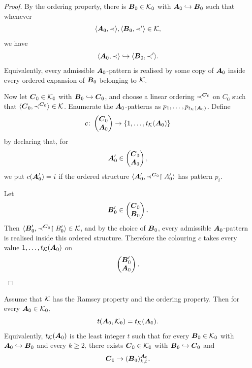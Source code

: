 \begin{proof}
    By the ordering property, there is \(\boldsymbol{B}_0\in\mathcal{K}_0\) with
    \(\boldsymbol{A}_0\hookrightarrow\boldsymbol{B}_0\) such that whenever
    \[
        \langle\boldsymbol{A}_0,\prec\rangle,\langle\boldsymbol{B}_0,\prec'\rangle\in\mathcal{K},
    \]
    we have
    \[
        \langle\boldsymbol{A}_0,\prec\rangle\hookrightarrow\langle\boldsymbol{B}_0,\prec'\rangle.
    \]
    Equivalently, every admissible \(\boldsymbol{A}_0\)-pattern is realised by some copy of \(\boldsymbol{A}_0\) inside every ordered expansion of \(\boldsymbol{B}_0\) belonging to \(\mathcal{K}\).

    Now let \(\boldsymbol{C}_0\in\mathcal{K}_0\) with \(\boldsymbol{B}_0\hookrightarrow\boldsymbol{C}_0\), and choose a linear ordering \(\prec^{\boldsymbol{C}_0}\) on \(C_0\) such that \(\langle\boldsymbol{C}_0,\prec^{\boldsymbol{C}_0}\rangle\in\mathcal{K}\). Enumerate the \(\boldsymbol{A}_0\)-patterns as \(p_1,\dots,p_{t_{\mathcal{K}}(\boldsymbol{A}_0)}\).
    Define
    \[
        c\colon\begin{pmatrix}\boldsymbol{C}_0\\ \boldsymbol{A}_0\end{pmatrix}\to\{1,\dots,t_{\mathcal{K}}(\boldsymbol{A}_0)\}
    \]
    by declaring that, for
    \[
        \boldsymbol{A}_0'\in\begin{pmatrix}\boldsymbol{C}_0\\ \boldsymbol{A}_0\end{pmatrix},
    \]
    we put \(c(\boldsymbol{A}_0')=i\) if the ordered structure \(\langle\boldsymbol{A}_0',\prec^{\boldsymbol{C}_0}\restriction A_0'\rangle\) has pattern \(p_i\).

    Let
    \[
        \boldsymbol{B}_0'\in\begin{pmatrix}\boldsymbol{C}_0\\ \boldsymbol{B}_0\end{pmatrix}.
    \]
    Then \(\langle\boldsymbol{B}_0',\prec^{\boldsymbol{C}_0}\restriction B_0'\rangle\in\mathcal{K}\), and by the choice of \(\boldsymbol{B}_0\), every admissible \(\boldsymbol{A}_0\)-pattern is realised inside this ordered structure. Therefore the colouring \(c\) takes every value \(1,\dots,t_{\mathcal{K}}(\boldsymbol{A}_0)\)
    on
    \[
        \begin{pmatrix}\boldsymbol{B}_0'\\ \boldsymbol{A}_0\end{pmatrix}.
    \]
\end{proof}

\begin{corollary}
    \label{cor:ramsey-degree-pattern-count}
    Assume that \(\mathcal{K}\) has the Ramsey property and the ordering property. Then for every \(\boldsymbol{A}_0\in\mathcal{K}_0\),
    \[
        t(\boldsymbol{A}_0,\mathcal{K}_0)=t_{\mathcal{K}}(\boldsymbol{A}_0).
    \]
    Equivalently, \(t_{\mathcal{K}}(\boldsymbol{A}_0)\) is the least integer \(t\) such that for every \(\boldsymbol{B}_0\in\mathcal{K}_0\) with \(\boldsymbol{A}_0\hookrightarrow\boldsymbol{B}_0\) and every \(k\geq 2\), there exists \(\boldsymbol{C}_0\in\mathcal{K}_0\) with \(\boldsymbol{B}_0\hookrightarrow\boldsymbol{C}_0\) and
    \[
        \boldsymbol{C}_0\to(\boldsymbol{B}_0)^{\boldsymbol{A}_0}_{k,t}.
    \]
\end{corollary}

